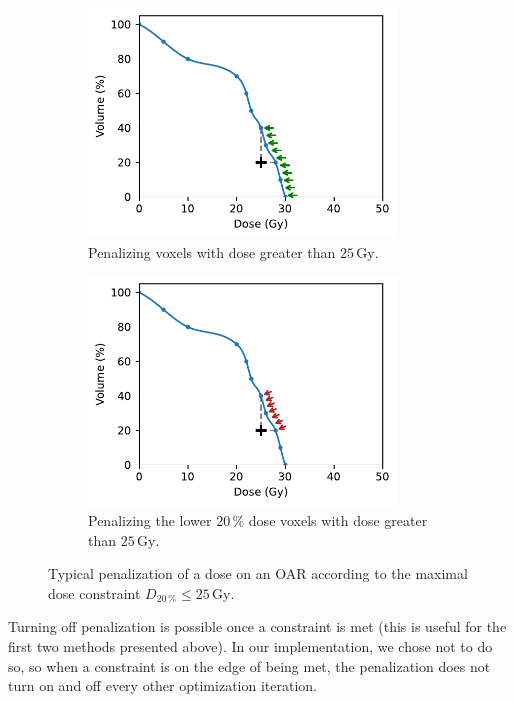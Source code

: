 \begin{figure}
\begin{subfigure}{0.32\textwidth}
		\includegraphics[width=0.9\textwidth]{constraint_penalization_plot_2.pdf}
		\caption{Penalizing voxels with dose greater than $25\,\text{Gy}$.}
		\label{fig:constraint_penalization_plot_2}
	\end{subfigure}
	\begin{subfigure}{0.32\textwidth}
		\centering
		\includegraphics[width=0.9\textwidth]{constraint_penalization_plot_3.pdf}
		\caption{Penalizing the lower $20\,\%$ dose voxels with dose greater than $25\,\text{Gy}$.}
		\label{fig:constraint_penalization_plot_3}
	\end{subfigure}
	\caption{Typical penalization of a dose on an OAR according to the maximal dose constraint $D_{20\,\%} \leq 25\,\text{Gy}$.}
	\label{fig:constraint_penalization}
\end{figure}

Turning off penalization is possible once a constraint is met (this is useful for the first two methods presented above).
In our implementation, we chose not to do so, so when a constraint is on the edge of being met, the penalization does not turn on and off every other optimization iteration.

